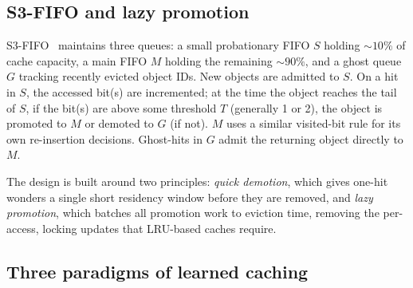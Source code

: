 \documentclass[letterpaper,twocolumn,10pt]{article}
\begin{document}
\subsection{S3-FIFO and lazy promotion}
 
S3-FIFO~\cite{s3fifo} maintains three queues: a small probationary
FIFO $S$ holding $\sim 10\%$ of cache capacity, a main FIFO $M$
holding the remaining $\sim 90\%$, and a ghost queue $G$ tracking
recently evicted object IDs. New objects are admitted to $S$. On a
hit in $S$, the accessed bit(s) are incremented; at the time the object reaches
the tail of $S$, if the bit(s) are above some threshold $T$ (generally 1 or 2), the object is promoted to $M$ or demoted to $G$ (if not). $M$ uses a similar
visited-bit rule for its own re-insertion decisions. Ghost-hits in $G$
admit the returning object directly to $M$.
 
The design is built around two principles: \emph{quick demotion}, which gives one-hit
wonders a single short residency window before they are removed,
and \emph{lazy promotion}, which batches all promotion work to
eviction time, removing the per-access, locking updates that
LRU-based caches require.
 

\subsection{Three paradigms of learned caching}
 
\end{document}

